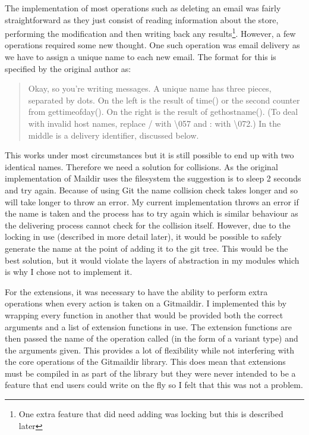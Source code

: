 The implementation of most operations such as deleting an email was fairly straightforward as they just consist of reading information about the store, performing the modification and then writing back any results\footnote{One extra feature that did need adding was locking but this is described later}. However, a few operations required some new thought. One such operation was email delivery as we have to assign a unique name to each new email. The format for this is specified by the original author\cite{bernstein2000maildir} as:
\begin{quote}
  Okay, so you're writing messages. A unique name has three pieces, separated by dots. On the left is the result of time() or the second counter from gettimeofday(). On the right is the result of gethostname(). (To deal with invalid host names, replace / with \textbackslash057 and : with \textbackslash072.) In the middle is a delivery identifier, discussed below.
\end{quote}
This works under most circumstances but it is still possible to end up with two identical names. Therefore we need a solution for collisions. As the original implementation of Maildir uses the filesystem the suggestion is to sleep 2 seconds and try again. Because of using Git the name collision check takes longer and so will take longer to throw an error. My current implementation throws an error if the name is taken and the process has to try again which is similar behaviour as the delivering process cannot check for the collision itself. However, due to the locking in use (described in more detail later), it would be possible to safely generate the name at the point of adding it to the git tree. This would be the best solution, but it would violate the layers of abstraction in my modules which is why I chose not to implement it.

For the extensions, it was necessary to have the ability to perform extra operations when every action is taken on a Gitmaildir. I implemented this by wrapping every function in another that would be provided both the correct arguments and a list of extension functions in use. The extension functions are then passed the name of the operation called (in the form of a variant type) and the arguments given. This provides a lot of flexibility while not interfering with the core operations of the Gitmaildir library. This does mean that extensions must be compiled in as part of the library but they were never intended to be a feature that end users could write on the fly so I felt that this was not a problem.

